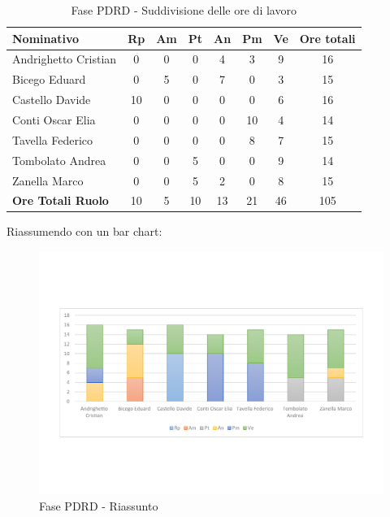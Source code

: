 \documentclass[../PianoProgetto.tex]{subfiles}
\begin{document}
	\begin{table}[h]
	
		\begin{tabularx}{\textwidth}{l  * {6}{C}  c}
			\toprule
			\textbf{Nominativo} & \textbf{Rp} & \textbf{Am} & \textbf{Pt} 
						& \textbf{An} & \textbf{Pm} & \textbf{Ve} & \textbf{Ore totali} \\
			\midrule
			Andrighetto Cristian & 0 & 0 & 0 & 4 & 3 & 9 & 16 \\
			Bicego Eduard & 0 & 5 &	0 &	7 &	0 &	3 &	15 \\
			Castello Davide & 10 & 0 & 0 & 0 & 0 & 6 & 16 \\
			Conti Oscar Elia & 0 & 0 & 0 & 0 & 10 &	4 &	14 \\
			Tavella Federico &	0 & 0 &	0 &	0 &	8 &	7 &	15 \\
			Tombolato Andrea & 0 & 0 & 5 & 0 & 0 & 9 & 14 \\
			Zanella Marco & 0 & 0 & 5 &	2 &	0 &	8 &	15 \\
			\midrule			
			\textbf{Ore Totali Ruolo} & 10 & 5 & 10 & 13 &	21 & 46 & 105 \\
			\bottomrule
		\end{tabularx}
		\caption{Fase PDRD - Suddivisione delle ore di lavoro}
		\label{tab:fasePDRD_ore}
	\end{table}
\vfill	
	Riassumendo con un bar chart:
	
	\begin{figure}[!h]
		\centering
		\includegraphics[width=\textwidth , trim=2cm 5cm 2cm 5cm]{grafici/PDRD/PDRD-ore-persona}
			\caption{Fase PDRD - Riassunto}
		\label{fig:BarChart-fasePDRD_ore}
	\end{figure}
\vfill	
\newpage	
	
\end{document}
